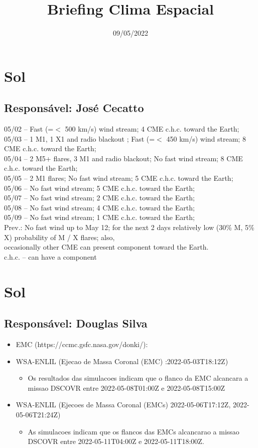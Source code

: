 \documentclass[11pt, oneside]{article}
\title{Briefing Clima Espacial}
\date{09/05/2022}
\begin{document}
\maketitle 

 \section{Sol} 
 \subsection{Responsável: José Cecatto}

05/02 – Fast (=$<$ 500 km/s) wind stream; 4 CME c.h.c. toward the Earth; \\ 05/03 – 1 M1, 1 X1 and radio blackout ; Fast (=$<$ 450 km/s) wind stream; 8 CME c.h.c. toward the Earth; \\ 05/04 – 2 M5+ flares, 3 M1 and radio blackout; No fast wind stream; 8 CME c.h.c. toward the Earth; \\ 05/05 – 2 M1 flares; No fast wind stream; 5 CME c.h.c. toward the Earth; \\ 05/06 – No fast wind stream; 5 CME c.h.c. toward the Earth; \\ 05/07 – No fast wind stream; 2 CME c.h.c. toward the Earth; \\ 05/08 – No fast wind stream; 4 CME c.h.c. toward the Earth; \\ 05/09 – No fast wind stream; 1 CME c.h.c. toward the Earth; \\ Prev.: No fast wind up to May 12; for the next 2 days relatively low (30\% M, 5\% X) probability of M / X flares; also, \\ occasionally other CME can present component toward the Earth. \\ c.h.c. – can have a component\section{Sol} 
 \subsection{Responsável: Douglas Silva}

\begin{itemize} 
 \item EMC (https://ccmc.gsfc.nasa.gov/donki/):
\item WSA-ENLIL (Ejecao de Massa Coronal (EMC) :2022-05-03T18:12Z)
\begin{itemize} 
 \item Os resultados das simulacoes indicam que o flanco da EMC alcancara a missao DSCOVR entre 2022-05-08T01:00Z e 2022-05-08T15:00Z
\end{itemize} 
 \item WSA-ENLIL (Ejecoes de Massa Coronal (EMCs) 2022-05-06T17:12Z, 2022-05-06T21:24Z)
\begin{itemize} 
 \item As simulacoes indicam que os flancos das EMCs alcancarao a missao DSCOVR entre 2022-05-11T04:00Z e 2022-05-11T18:00Z. 
\end{itemize} 
 \end{itemize} 
 
\end{document}
